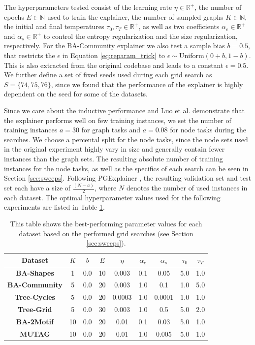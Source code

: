 The hyperparameters tested consist of the learning rate $\eta \in \mathbb{R}^+$, the number of epochs $E \in \mathbb{N}$ used to train the explainer, the number of sampled graphs $K \in \mathbb{N}$, the initial and final temperatures $\tau_0, \tau_T \in \mathbb{R}^+$, as well as two coefficients $\alpha_e\in \mathbb{R}^+$ and $\alpha_s\in \mathbb{R}^+$ to control the entropy regularization and the size regularization, respectively. For the BA-Community explainer we also test a sample bias $b=0.5$, that restricts the $\epsilon$ in Equation \ref{eq:reparam_trick} to $\epsilon \sim \text{Uniform}(0+b,1-b)$. This is also extracted from the original codebase and leads to a constant $\epsilon=0.5$. We further define a set of fixed seeds used during each grid search as $S=\{74,75,76\}$, since we found that the performance of the explainer is highly dependent on the seed for some of the datasets.

Since we care about the inductive performance and Luo et al. \cite{luo2020parameterized} demonstrate that the explainer performs well on few training instances, we set the number of training instances $a=30$ for graph tasks and $a=0.08$ for node tasks during the searches. We choose a percental split for the node tasks, since the node sets used in the original experiment highly vary in size and generally contain fewer instances than the graph sets. The resulting absolute number of training instances for the node tasks, as well as the specifics of each search can be seen in Section \ref{sec:sweeps}. Following PGExplainer \cite{luo2020parameterized}, the resulting validation set and test set each have a size of $\frac{(N-a)}{2}$, where $N$ denotes the number of used instances in each dataset. The optimal hyperparameter values used for the following experiments are listed in Table \ref{tab:best_sweep_values}.

\begin{table}[h]
    \centering
    \scriptsize
    \begin{tabular}{|c|c|c|c|c|c|c|c|c|} \hline
    Dataset & $K$ & $b$ & $E$ & $\eta$ & $\alpha_e$ & $\alpha_s$ & $\tau_0$ & $\tau_T$ \\ \hline
    \textbf{BA-Shapes} & 1 & 0.0 & 10 & 0.003 & 0.1 & 0.05 & 5.0 & 1.0 \\ \hline
    \textbf{BA-Community} & 5 & 0.0 & 20 & 0.003 & 1.0 & 0.1 & 1.0 & 5.0 \\ \hline
    \textbf{Tree-Cycles} & 5 & 0.0 & 20 & 0.0003 & 1.0 & 0.0001 & 1.0 & 1.0 \\ \hline
    \textbf{Tree-Grid} & 5 & 0.0 & 30 & 0.003 & 1.0 & 0.5 & 5.0 & 2.0 \\ \hline
    \textbf{BA-2Motif} & 10 & 0.0 & 20 & 0.01 & 0.1 & 0.03 & 5.0 & 1.0 \\ \hline
    \textbf{MUTAG} & 10 & 0.0 & 20 & 0.01 & 1.0 & 0.005 & 5.0 & 1.0 \\ \hline
    \end{tabular}
    \caption[Optimal explainer parameter values for each dataset]{This table shows the best-performing parameter values for each dataset based on the performed grid searches (see Section \ref{sec:sweeps}).}
    \label{tab:best_sweep_values}
  \end{table}

